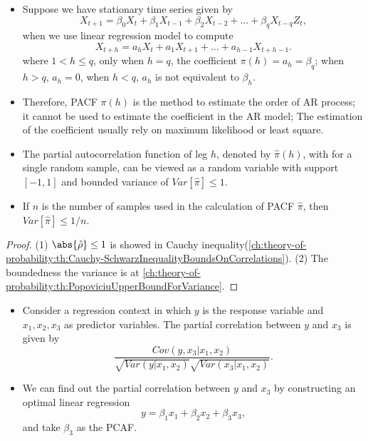 \begin{note}\hfill
\begin{itemize}
	\item Suppose we have stationary time series given by
	$$X_{t+1} = \beta_0 X_t + \beta_1 X_{t-1} + \beta_2 X_{t-2} + ... + \beta_q X_{t-q} Z_t,$$
	when we use linear regression model	to compute 
	$$X_{t+h} = a_h X_t + a_1 X_{t+1} + ... + a_{h-1} X_{t+h-1}.$$
	where $1<h \leq q$, only when $h = q$, the coefficient $\pi(h) = a_h = \beta_q$; when $h > q$, $a_h = 0$, when $h < q$,  $a_h$ is not equivalent to $\beta_h$.
	\item Therefore, PACF $\pi(h)$ is the method to estimate the order of AR process; it cannot be used to estimate the coefficient in the AR model; The estimation of the coefficient usually rely on maximum likelihood or least square.  
\end{itemize}	
	
 
\end{note}




\begin{lemma}\cite[66]{box2015time}\hfill
\begin{itemize}
	\item The partial autocorrelation function of leg $h$, denoted by $\hat{\pi}(h)$, with for a single random sample,  can be viewed as a random variable with support $[-1,1]$ and bounded variance of $Var[\hat{\pi}] \leq 1$. 
	\item If $n$ is the number of samples used in the calculation of PACF $\hat{\pi}$, then   $Var[\hat{\pi}] \leq 1/n$.
\end{itemize}	
	
\end{lemma}
\begin{proof}
	(1) $\abs{\hat{\rho}} \leq 1$ is showed in Cauchy inequality(\autoref{ch:theory-of-probability:th:Cauchy-SchwarzInequalityBoundsOnCorrelations}).
	(2) The boundedness the variance is at
	\autoref{ch:theory-of-probability:th:PopoviciuUpperBoundForVariance}.
\end{proof}


\begin{remark}\hfill
	\begin{itemize}
		\item Consider a regression context in which $y$ is the response variable and $x_1,x_2,x_3$ as predictor variables. The partial correlation between $y$ and $x_3$ is given by
		$$\frac{Cov(y,x_3|x_1,x_2)}{\sqrt{Var(y|x_1,x_2)}\sqrt{Var(x_3|x_1,x_2)}}.$$
		\item We can find out the partial correlation between $y$ and $x_3$ by constructing an optimal linear regression
		$$y = \beta_1 x_1 + \beta_2 x_2 + \beta_3 x_3,$$
		and take $\beta_3$ as the PCAF.
	\end{itemize}	
\end{remark}


